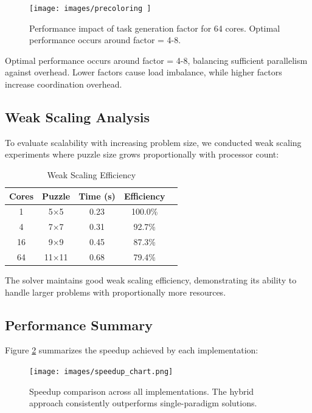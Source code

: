 \begin{figure}[htbp]
\centering
\texttt{[image: images/precoloring ]}
\caption{Performance impact of task generation factor for 64 cores. Optimal performance occurs around factor = 4-8.}
\label{fig:task_factor}
\end{figure}

Optimal performance occurs around factor = 4-8, balancing sufficient parallelism against overhead. Lower factors cause load imbalance, while higher factors increase coordination overhead.

\subsection{Weak Scaling Analysis}
To evaluate scalability with increasing problem size, we conducted weak scaling experiments where puzzle size grows proportionally with processor count:

\begin{table}[htbp]
\caption{Weak Scaling Efficiency}
\begin{center}
\begin{tabular}{@{}ccccc@{}}
\toprule
\textbf{Cores} & \textbf{Puzzle} & \textbf{Time (s)} & \textbf{Efficiency} \\
\midrule
1 & 5×5 & 0.23 & 100.0\% \\
4 & 7×7 & 0.31 & 92.7\% \\
16 & 9×9 & 0.45 & 87.3\% \\
64 & 11×11 & 0.68 & 79.4\% \\
\bottomrule
\end{tabular}
\end{center}
\label{tab:weak_scaling}
\end{table}

The solver maintains good weak scaling efficiency, demonstrating its ability to handle larger problems with proportionally more resources.

\subsection{Performance Summary}
Figure \ref{fig:speedup_comparison} summarizes the speedup achieved by each implementation:

\begin{figure}[htbp]
\centering
\texttt{[image: images/speedup\_chart.png]}
\caption{Speedup comparison across all implementations. The hybrid approach consistently outperforms single-paradigm solutions.}
\label{fig:speedup_comparison}
\end{figure}

